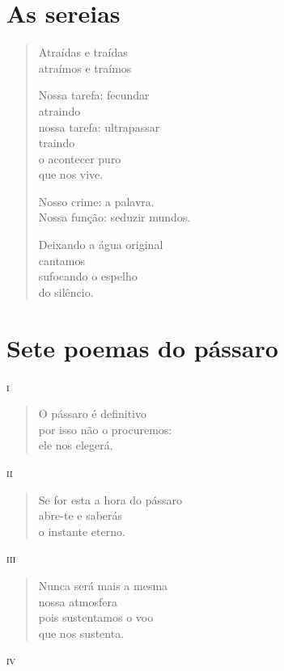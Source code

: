 \chapter{As sereias}

\begin{verse}
Atraídas e traídas\\
atraímos e traímos

Nossa tarefa: fecundar\\
\qquad\qquad\qquad atraindo\\
nossa tarefa: ultrapassar\\
\qquad\qquad\qquad traindo\\
o acontecer puro\\
que nos vive.

Nosso crime: a palavra.\\
Nossa função: seduzir mundos.

Deixando a água original\\
cantamos\\
sufocando o espelho\\
do silêncio.
\end{verse}


\chapter{Sete poemas do pássaro}

\forceindent\textsc{i}

\begin{verse}
O pássaro é definitivo\\
por isso não o procuremos:\\
ele nos elegerá.
\end{verse}

\medskip
\textsc{ii}

\begin{verse}
Se for esta a hora do pássaro\\
abre-te e saberás\\
o instante eterno.
\end{verse}

\medskip
\textsc{iii}

\begin{verse}
Nunca será mais a mesma\\
nossa atmosfera\\
pois sustentamos o voo\\
que nos sustenta.
\end{verse}

\medskip
\textsc{iv}

